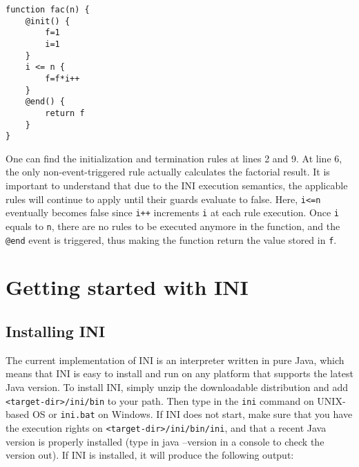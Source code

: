 \documentclass[11pt]{article}
\begin{document}
\begin{lstlisting}
function fac(n) {
	@init() {
		f=1
		i=1
	}
	i <= n {
		f=f*i++
	}
	@end() {
		return f
	}
}
\end{lstlisting}

One can find the initialization and termination rules at lines 2 and 9. At line 6, the only non-event-triggered rule actually calculates the factorial result. It is important to understand that due to the INI execution semantics, the applicable rules will continue to apply until their guards evaluate to false. Here, \texttt{i<=n} eventually becomes false since \texttt{i++} increments \texttt{i} at each rule execution. Once \texttt{i} equals to \texttt{n}, there are no rules to be executed anymore in the function, and the \texttt{@end} event is triggered, thus making the function return the value stored in \texttt{f}.

\section{Getting started with INI}

\subsection{Installing INI}

The current implementation of INI is an interpreter written in pure Java, which means that INI is easy to install and run on any platform that supports the latest Java version. To install INI, simply unzip the downloadable distribution and add \texttt{<target-dir>/ini/bin} to your path. Then type in the \texttt{ini} command on UNIX-based OS or \texttt{ini.bat} on Windows. If INI does not start, make sure that you have the execution rights on \texttt{<target-dir>/ini/bin/ini}, and that a recent Java version is properly installed (type in java --version in a console to check the version out). If INI is installed, it will produce the following output:
\end{document}
